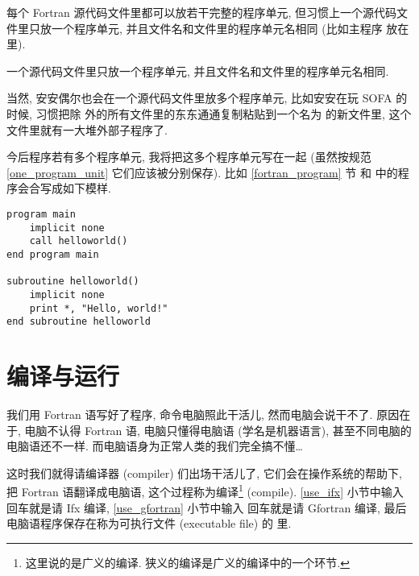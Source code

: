 每个 Fortran 源代码文件里都可以放若干完整的程序单元, 但习惯上一个源代码文件里只放一个程序单元, 并且文件名和文件里的程序单元名相同 (比如主程序  放在  里).
\begin{convention}
    一个源代码文件里只放一个程序单元, 并且文件名和文件里的程序单元名相同.\label{one_program_unit}
\end{convention}
当然, 安安偶尔也会在一个源代码文件里放多个程序单元, 比如安安在玩 SOFA 的时候, 习惯把除  外的所有文件里的东东通通复制粘贴到一个名为  的新文件里, 这个文件里就有一大堆外部子程序了.

今后程序若有多个程序单元, 我将把这多个程序单元写在一起 (虽然按规范 \ref{one_program_unit} 它们应该被分别保存). 比如 \ref{fortran_program} 节  和  中的程序会合写成如下模样.
\begin{lstlisting}
program main
    implicit none
    call helloworld()
end program main

subroutine helloworld()
    implicit none
    print *, "Hello, world!"
end subroutine helloworld
\end{lstlisting}

\section{编译与运行}\label{run_fortran}

我们用 Fortran 语写好了程序, 命令电脑照此干活儿, 然而电脑会说干不了. 原因在于, 电脑不认得 Fortran 语, 电脑只懂得电脑语 (学名是机器语言), 甚至不同电脑的电脑语还不一样. 而电脑语身为正常人类的我们完全搞不懂\dots{}

这时我们就得请编译器 (compiler) 们出场干活儿了, 它们会在操作系统的帮助下, 把 Fortran 语翻译成电脑语, 这个过程称为编译\footnote{这里说的是广义的编译. 狭义的编译是广义的编译中的一个环节.} (compile). \ref{use_ifx} 小节中输入  回车就是请 Ifx 编译, \ref{use_gfortran} 小节中输入  回车就是请 Gfortran 编译, 最后电脑语程序保存在称为可执行文件 (executable file) 的  里.

